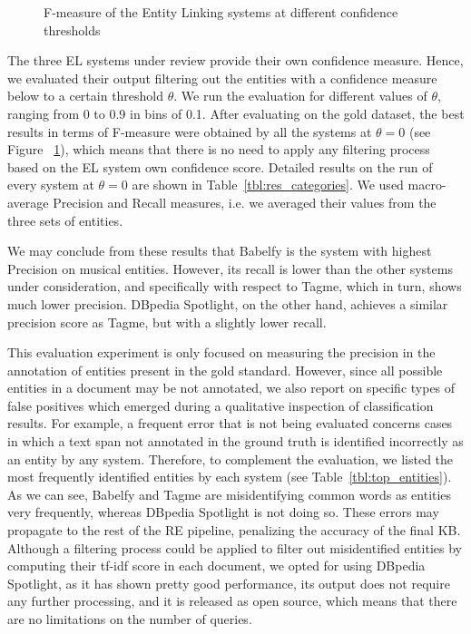 \begin{figure}[!htp]
\centerline{}
\caption{F-measure of the Entity Linking systems at different confidence thresholds}
\label{fig:confidence_el}
\end{figure}

The three \textsc{EL} systems under review provide their own confidence measure. Hence, we evaluated their output filtering out the entities with a confidence measure below to a certain threshold $\theta$. We run the evaluation for different values of $\theta$, ranging from 0 to 0.9 in bins of 0.1. After evaluating on the gold dataset, the best results in terms of F-measure were obtained by all the systems at $\theta = 0$ (see Figure ~\ref{fig:confidence_el}), which means that there is no need to apply any filtering process based on the \textsc{EL} system own confidence score. Detailed results on the run of every system at $\theta = 0$ are shown in Table~\ref{tbl:res_categories}. We used macro-average Precision and Recall measures, i.e. we averaged their values from the three sets of entities.

We may conclude from these results that Babelfy is the system with highest Precision on musical entities. However, its recall is lower than the other systems under consideration, and specifically with respect to Tagme, which in turn, shows much lower precision. DBpedia Spotlight, on the other hand, achieves a similar precision score as Tagme, but with a slightly lower recall. 

This evaluation experiment is only focused on measuring the precision in the annotation of entities present in the gold standard. However, since all possible entities in a document may be not annotated, we also report on specific types of false positives which emerged during a qualitative inspection of classification results. For example, a frequent error that is not being evaluated concerns cases in which a text span not annotated in the ground truth is identified incorrectly as an entity by any system. Therefore, to complement the evaluation, we listed the most frequently identified entities by each system (see Table~\ref{tbl:top_entities}). As we can see, Babelfy and Tagme are misidentifying common words as entities very frequently, whereas DBpedia Spotlight is not doing so. 
These errors may propagate to the rest of the \textsc{RE} pipeline, penalizing the accuracy of the final KB.
Although a filtering process could be applied to filter out misidentified entities by computing their tf-idf score in each document, we opted for using DBpedia Spotlight, as it has shown pretty good performance, its output does not require any further processing, and it is released as open source, which means that there are no limitations on the number of queries.

